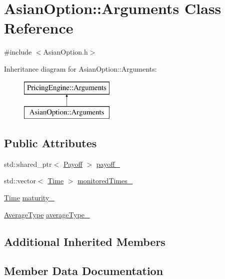 \hypertarget{class_asian_option_1_1_arguments}{}\section{Asian\+Option\+:\+:Arguments Class Reference}
\label{class_asian_option_1_1_arguments}


{\ttfamily \#include $<$Asian\+Option.\+h$>$}

Inheritance diagram for Asian\+Option\+:\+:Arguments\+:\begin{figure}[H]
\begin{center}
\leavevmode
\includegraphics[height=2.000000cm]{class_asian_option_1_1_arguments}
\end{center}
\end{figure}
\subsection*{Public Attributes}
\begin{DoxyCompactItemize}
\item 
std\+::shared\+\_\+ptr$<$ \hyperlink{class_payoff}{Payoff} $>$ \hyperlink{class_asian_option_1_1_arguments_ae44f022e21c05aa688d1d94a0f57d125}{payoff\+\_\+}
\item 
std\+::vector$<$ \hyperlink{_name_def_8h_ac2d3e0ba793497bcca555c7c2cf64ff3}{Time} $>$ \hyperlink{class_asian_option_1_1_arguments_a27e013476613aec57076742ba561a722}{monitored\+Times\+\_\+}
\item 
\hyperlink{_name_def_8h_ac2d3e0ba793497bcca555c7c2cf64ff3}{Time} \hyperlink{class_asian_option_1_1_arguments_ad39a2dee07ec9ec77cb64cb75e44a056}{maturity\+\_\+}
\item 
\hyperlink{class_asian_option_add7292791bf85820ff9fdbfd4407f3b9}{Average\+Type} \hyperlink{class_asian_option_1_1_arguments_aa93577b436b362136035ed3f6fc742bf}{average\+Type\+\_\+}
\end{DoxyCompactItemize}
\subsection*{Additional Inherited Members}


\subsection{Member Data Documentation}
\hypertarget{class_asian_option_1_1_arguments_aa93577b436b362136035ed3f6fc742bf}{}\label{class_asian_option_1_1_arguments_aa93577b436b362136035ed3f6fc742bf} 

